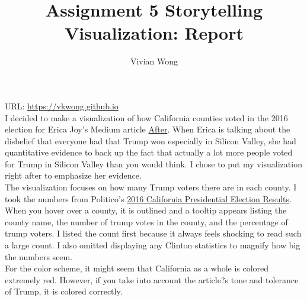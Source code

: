 \documentclass[12pt,fullpage]{article}
\title{Assignment 5 Storytelling Visualization: Report}
\author{Vivian Wong}
\begin{document}
 
\maketitle %
URL: \url{https://vkwong.github.io}\\
 
I decided to make a visualization of how California counties voted in the 2016 election for Erica Joy's Medium article \href{https://medium.com/@ericajoy/after-87ce712b3645}{After}. When Erica is talking about the disbelief that everyone had that Trump won especially in Silicon Valley, she had quantitative evidence to back up the fact that actually a lot more people voted for Trump in Silicon Valley than you would think. I chose to put my visualization right after to emphasize her evidence.\\
 
The visualization focuses on how many Trump voters there are in each county. I took the numbers from Politico's \href{https://www.politico.com/2016-election/results/map/president/california/}{2016 California Presidential Election Results}. When you hover over a county, it is outlined and a tooltip appears listing the county name, the number of trump votes in the county, and the percentage of trump voters. I listed the count first because it always feels shocking to read such a large count. I also omitted displaying any Clinton statistics to magnify how big the numbers seem.\\
 
For the color scheme, it might seem that California as a whole is colored extremely red. However, if you take into account the article?s tone and tolerance of Trump, it is colored correctly.
\end{document}
